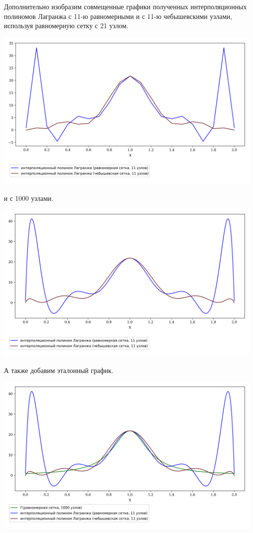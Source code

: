 \documentclass[a4paper, 14pt]{extarticle}
\begin{document}
Дополнительно изобразим совмещенные графики полученных интерполяционных полиномов Лагранжа 
с 11-ю равномерными и с 11-ю чебышевскими узлами, используя равномерную
сетку с 21 узлом.

\begin{center}
  \includegraphics[width=1\textwidth]{uniformXchebushev21}
\end{center}

и с 1000 узлами.

\begin{center}
  \includegraphics[width=1\textwidth]{uniformXchebushev1000}
\end{center}

А также добавим эталонный график.

\begin{center}
  \includegraphics[width=1\textwidth]{uniformXrefXchebushev1000}
\end{center}
\end{document}

